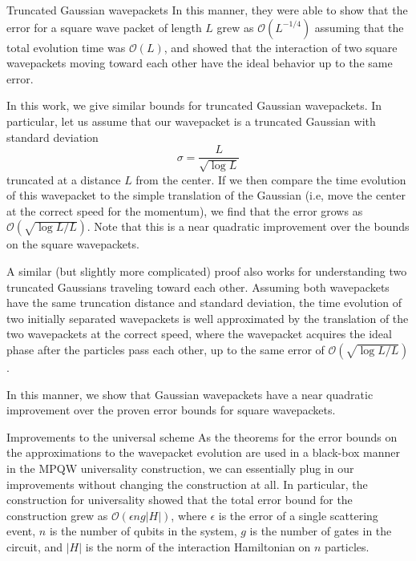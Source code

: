 \documentclass{beamer}
\newlength{\onecolwid}
\newcommand{\OO}{\mathcal{O}}
\begin{document}
\begin{frame}[t]
\begin{columns}[t]
\begin{column}{\onecolwid}
\begin{block}{Truncated Gaussian wavepackets}
In this manner, they were able to show that the error for a square wave packet of length $L$ grew as $\mathcal{O}(L^{-1/4})$ assuming that the total evolution time was $\mathcal{O}(L)$, and showed that the interaction of two square wavepackets moving toward each other have the ideal behavior up to the same error.

In this work, we give similar bounds for truncated Gaussian wavepackets.  In particular, let us assume that our wavepacket is a truncated Gaussian with standard deviation 
\[
  \sigma = \frac{L}{\sqrt{\log L}}
\]
truncated at a distance $L$ from the center.  If we then compare the time evolution of this wavepacket to the simple translation of the Gaussian (i.e, move the center at the correct speed for the momentum), we find that the error grows as $\OO(\sqrt{\log L/L})$.  Note that this is a near quadratic improvement over the bounds on the square wavepackets.

A similar (but slightly more complicated) proof also works for understanding two truncated Gaussians traveling toward each other.  Assuming both wavepackets have the same truncation distance and standard deviation, the time evolution of two initially separated wavepackets is well approximated by the translation of the two wavepackets at the correct speed, where the wavepacket acquires the ideal phase after the particles pass each other, up to the same error of $\OO(\sqrt{\log L/L})$.

In this manner, we show that Gaussian wavepackets have a near quadratic improvement over the proven error bounds for square wavepackets. 



    \end{block}
    
    \begin{block}{Improvements to the universal scheme}
	  As the theorems for the error bounds on the approximations to the wavepacket evolution are used in a black-box manner in the MPQW universality construction, we can essentially plug in our improvements without changing the construction at all.  In particular, the construction for universality showed that the total error bound for the construction grew as $\OO(\epsilon n g |H|)$, where $\epsilon$ is the error of a single scattering event, $n$ is the number of qubits in the system, $g$ is the number of gates in the circuit, and $|H|$ is the norm of the interaction Hamiltonian on $n$ particles.  
	

\end{block}
\end{column}
\end{columns}
\end{frame}
\end{document}
